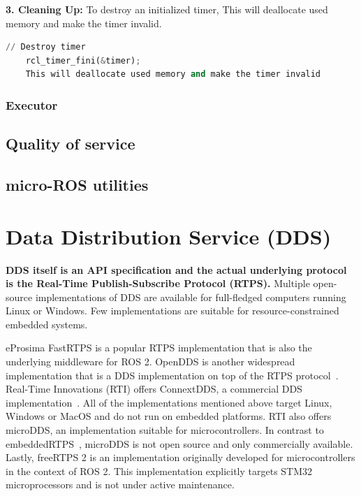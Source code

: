 \textbf{3. Cleaning Up:} To destroy an initialized timer, This will deallocate used memory and make the timer invalid.
\begin{lstlisting}[language=Python, caption=Timer Cleaning up]
    // Destroy timer
    rcl_timer_fini(&timer);
    This will deallocate used memory and make the timer invalid    
\end{lstlisting}



\subsubsection{Executor}

\subsection{Quality of service}

\subsection{micro-ROS utilities}

\section{Data Distribution Service (DDS)}
\textbf{DDS itself is an API specification and the actual underlying protocol is the Real-Time Publish-Subscribe Protocol (RTPS)\cite{RTPS}.} Multiple open-source implementations of DDS are available for full-ﬂedged computers running Linux or Windows. Few implementations are suitable for resource-constrained embedded systems.

eProsima FastRTPS is a popular RTPS implementation that is also the underlying middleware for ROS 2. OpenDDS is another widespread implementation that is a DDS implementation on top of the RTPS protocol~\cite{OpenDDS}. Real-Time Innovations (RTI) offers ConnextDDS, a commercial DDS implementation~\cite{ConnextDDS}. All of the implementations mentioned above target Linux, Windows or MacOS and do not run on embedded platforms. RTI also offers microDDS, an implementation suitable for microcontrollers. In contrast to embeddedRTPS~\cite{kampmann2019portable}, microDDS is not open source and only commercially available. Lastly, freeRTPS 2 is an implementation originally developed for microcontrollers in the context of ROS 2. This implementation explicitly targets STM32 microprocessors and is not under active maintenance.

